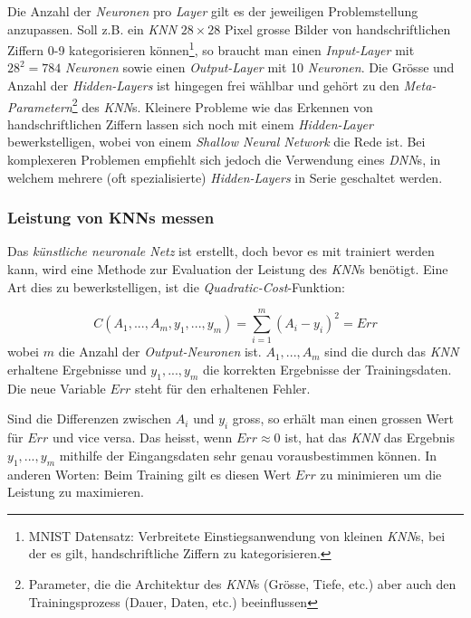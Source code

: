 Die Anzahl der \textit{Neuronen} pro \textit{Layer} gilt es der jeweiligen Problemstellung anzupassen. Soll z.B. ein \textit{KNN} $28\times 28$ Pixel grosse Bilder von handschriftlichen Ziffern 0-9 kategorisieren können\footnote{MNIST Datensatz\cite{mnist}: Verbreitete Einstiegsanwendung von kleinen \textit{KNN}s, bei der es gilt, handschriftliche Ziffern zu kategorisieren.}, so braucht man einen \textit{Input-Layer} mit $28^2=784$ \textit{Neuronen} sowie einen \textit{Output-Layer} mit 10 \textit{Neuronen}. Die Grösse und Anzahl der \textit{Hidden-Layers} ist hingegen frei wählbar und gehört zu den \textit{Meta-Parametern}\footnote{Parameter, die die Architektur des \textit{KNN}s (Grösse, Tiefe, etc.) aber auch den Trainingsprozess (Dauer, Daten, etc.) beeinflussen} des \textit{KNN}s. Kleinere Probleme wie das Erkennen von handschriftlichen Ziffern lassen sich noch mit einem \textit{Hidden-Layer} bewerkstelligen, wobei von einem \textit{Shallow Neural Network} die Rede ist. Bei komplexeren Problemen empfiehlt sich jedoch die Verwendung eines \textit{DNN}s, in welchem mehrere (oft spezialisierte) \textit{Hidden-Layers} in Serie geschaltet werden.

\subsubsection{Leistung von KNNs messen}\label{cha:theo:cost}

Das \textit{künstliche neuronale Netz} ist erstellt, doch bevor es mit trainiert werden kann, wird eine Methode zur Evaluation der Leistung des \textit{KNN}s benötigt. Eine Art dies zu bewerkstelligen, ist die \textit{Quadratic-Cost}-Funktion:

\begin{equation}\label{eq:cost}
C(A_1,...,A_m,y_1,...,y_m)=\sum_{i=1}^{m}\left(A_i-y_i\right)^2=Err
\end{equation}
wobei $m$ die Anzahl der \textit{Output-Neuronen} ist. $A_1,...,A_m$ sind die durch das \textit{KNN} erhaltene Ergebnisse und $y_1,...,y_m$ die korrekten Ergebnisse der Trainingsdaten. Die neue Variable $Err$ steht für den erhaltenen Fehler. %

Sind die Differenzen zwischen $A_i$ und $y_i$ gross, so erhält man einen grossen Wert für $Err$ und vice versa. Das heisst, wenn $Err \approx 0$ ist, hat das \textit{KNN} das Ergebnis $y_1,...,y_m$ mithilfe der Eingangsdaten sehr genau vorausbestimmen können. In anderen Worten: Beim Training gilt es diesen Wert $Err$ zu minimieren um die Leistung zu maximieren.

